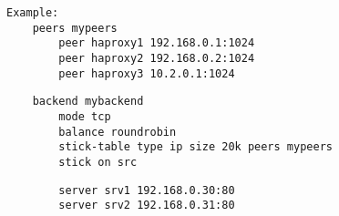 \begin{verbatim}
Example:
    peers mypeers
        peer haproxy1 192.168.0.1:1024
        peer haproxy2 192.168.0.2:1024
        peer haproxy3 10.2.0.1:1024
\end{verbatim}

\begin{verbatim}
    backend mybackend
        mode tcp
        balance roundrobin
        stick-table type ip size 20k peers mypeers
        stick on src
\end{verbatim}

\begin{verbatim}
        server srv1 192.168.0.30:80
        server srv2 192.168.0.31:80
\end{verbatim}

